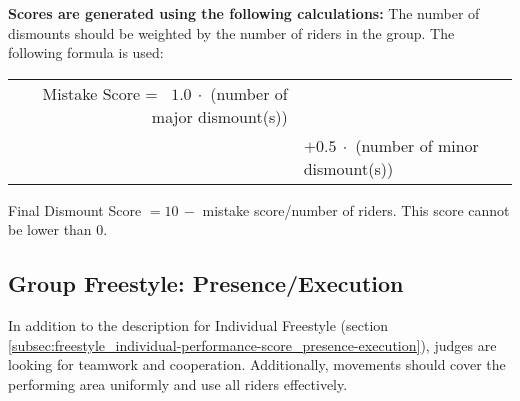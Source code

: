 \textbf{Scores are generated using the following calculations:}
The number of dismounts should be weighted by the number of riders in the group.
The following formula is used:

\begin{tabular}{r l}
Mistake Score = \ $1.0\ \cdot$ (number of major dismount(s)) \\
 & $+ 0.5\ \cdot$ (number of minor dismount(s)) \\
\end{tabular}

Final Dismount Score $= 10 \, -$ mistake score/number of riders.
This score cannot be lower than 0.

\subsection{Group Freestyle: Presence/Execution}
In addition to the description for Individual Freestyle (section \ref{subsec:freestyle_individual-performance-score_presence-execution}), judges are looking for teamwork and cooperation.
Additionally, movements should cover the performing area uniformly and use all riders effectively.


\newpage %
